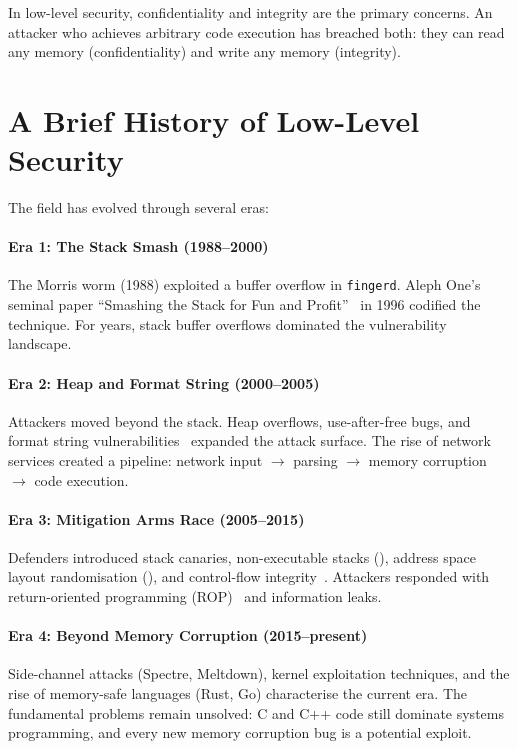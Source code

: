 In low-level security, confidentiality and integrity are the primary concerns. An attacker who achieves arbitrary code execution has breached both: they can read any memory (confidentiality) and write any memory (integrity).

\section{A Brief History of Low-Level Security}

The field has evolved through several eras:

\paragraph{Era 1: The Stack Smash (1988--2000)} The Morris worm (1988) exploited a buffer overflow in \texttt{fingerd}. Aleph One's seminal paper ``Smashing the Stack for Fun and Profit''~\cite{aleph1996smashing} in 1996 codified the technique. For years, stack buffer overflows dominated the vulnerability landscape.

\paragraph{Era 2: Heap and Format String (2000--2005)} Attackers moved beyond the stack. Heap overflows, use-after-free bugs, and format string vulnerabilities~\cite{scut2003nop} expanded the attack surface. The rise of network services created a pipeline: network input $\to$ parsing $\to$ memory corruption $\to$ code execution.

\paragraph{Era 3: Mitigation Arms Race (2005--2015)} Defenders introduced stack canaries, non-executable stacks (\DEP), address space layout randomisation (\ASLR), and control-flow integrity~\cite{abadi2005cfi}. Attackers responded with return-oriented programming (ROP)~\cite{shacham2007return} and information leaks.

\paragraph{Era 4: Beyond Memory Corruption (2015--present)} Side-channel attacks (Spectre, Meltdown), kernel exploitation techniques, and the rise of memory-safe languages (Rust, Go) characterise the current era. The fundamental problems remain unsolved: C and C++ code still dominate systems programming, and every new memory corruption bug is a potential exploit.

